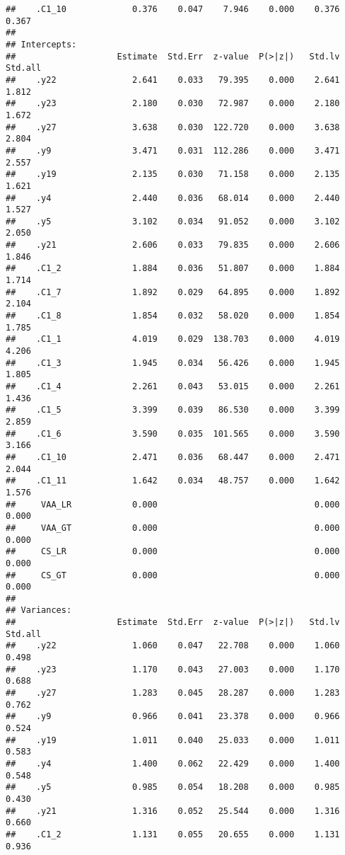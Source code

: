 \documentclass[
]{article}
\begin{document}
\begin{verbatim}
##    .C1_10             0.376    0.047    7.946    0.000    0.376    0.367
## 
## Intercepts:
##                    Estimate  Std.Err  z-value  P(>|z|)   Std.lv  Std.all
##    .y22               2.641    0.033   79.395    0.000    2.641    1.812
##    .y23               2.180    0.030   72.987    0.000    2.180    1.672
##    .y27               3.638    0.030  122.720    0.000    3.638    2.804
##    .y9                3.471    0.031  112.286    0.000    3.471    2.557
##    .y19               2.135    0.030   71.158    0.000    2.135    1.621
##    .y4                2.440    0.036   68.014    0.000    2.440    1.527
##    .y5                3.102    0.034   91.052    0.000    3.102    2.050
##    .y21               2.606    0.033   79.835    0.000    2.606    1.846
##    .C1_2              1.884    0.036   51.807    0.000    1.884    1.714
##    .C1_7              1.892    0.029   64.895    0.000    1.892    2.104
##    .C1_8              1.854    0.032   58.020    0.000    1.854    1.785
##    .C1_1              4.019    0.029  138.703    0.000    4.019    4.206
##    .C1_3              1.945    0.034   56.426    0.000    1.945    1.805
##    .C1_4              2.261    0.043   53.015    0.000    2.261    1.436
##    .C1_5              3.399    0.039   86.530    0.000    3.399    2.859
##    .C1_6              3.590    0.035  101.565    0.000    3.590    3.166
##    .C1_10             2.471    0.036   68.447    0.000    2.471    2.044
##    .C1_11             1.642    0.034   48.757    0.000    1.642    1.576
##     VAA_LR            0.000                               0.000    0.000
##     VAA_GT            0.000                               0.000    0.000
##     CS_LR             0.000                               0.000    0.000
##     CS_GT             0.000                               0.000    0.000
## 
## Variances:
##                    Estimate  Std.Err  z-value  P(>|z|)   Std.lv  Std.all
##    .y22               1.060    0.047   22.708    0.000    1.060    0.498
##    .y23               1.170    0.043   27.003    0.000    1.170    0.688
##    .y27               1.283    0.045   28.287    0.000    1.283    0.762
##    .y9                0.966    0.041   23.378    0.000    0.966    0.524
##    .y19               1.011    0.040   25.033    0.000    1.011    0.583
##    .y4                1.400    0.062   22.429    0.000    1.400    0.548
##    .y5                0.985    0.054   18.208    0.000    0.985    0.430
##    .y21               1.316    0.052   25.544    0.000    1.316    0.660
##    .C1_2              1.131    0.055   20.655    0.000    1.131    0.936

\end{verbatim}
\end{document}
